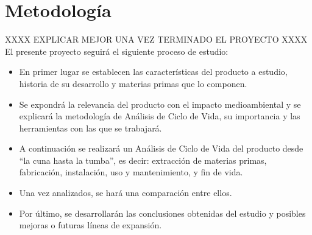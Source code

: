 \section{Metodología}

XXXX EXPLICAR MEJOR UNA VEZ TERMINADO EL PROYECTO XXXX
El presente proyecto seguirá el siguiente proceso de estudio:

\begin{itemize}
  \item En primer lugar se establecen las características del producto a estudio, historia de su desarrollo y materias primas que lo componen.
  \item Se expondrá la relevancia del producto con el impacto medioambiental y se explicará la metodología de Análisis de Ciclo de Vida, su importancia y las herramientas con las que se trabajará.
  \item A continuación se realizará un Análisis de Ciclo de Vida del producto desde ``la cuna hasta la tumba'', es decir: extracción de materias primas, fabricación, instalación, uso y mantenimiento, y fin de vida.
  \item Una vez analizados, se hará una comparación entre ellos.
  \item Por último, se desarrollarán las conclusiones obtenidas del estudio y posibles mejoras o futuras líneas de expansión.
\end{itemize}

